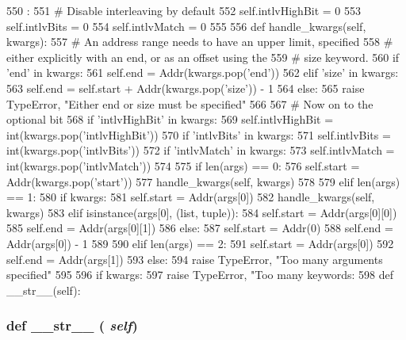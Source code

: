 \begin{DoxyCode}
550                                        :
551         # Disable interleaving by default
552         self.intlvHighBit = 0
553         self.intlvBits = 0
554         self.intlvMatch = 0
555 
556         def handle_kwargs(self, kwargs):
557             # An address range needs to have an upper limit, specified
558             # either explicitly with an end, or as an offset using the
559             # size keyword.
560             if 'end' in kwargs:
561                 self.end = Addr(kwargs.pop('end'))
562             elif 'size' in kwargs:
563                 self.end = self.start + Addr(kwargs.pop('size')) - 1
564             else:
565                 raise TypeError, "Either end or size must be specified"
566 
567             # Now on to the optional bit
568             if 'intlvHighBit' in kwargs:
569                 self.intlvHighBit = int(kwargs.pop('intlvHighBit'))
570             if 'intlvBits' in kwargs:
571                 self.intlvBits = int(kwargs.pop('intlvBits'))
572             if 'intlvMatch' in kwargs:
573                 self.intlvMatch = int(kwargs.pop('intlvMatch'))
574 
575         if len(args) == 0:
576             self.start = Addr(kwargs.pop('start'))
577             handle_kwargs(self, kwargs)
578 
579         elif len(args) == 1:
580             if kwargs:
581                 self.start = Addr(args[0])
582                 handle_kwargs(self, kwargs)
583             elif isinstance(args[0], (list, tuple)):
584                 self.start = Addr(args[0][0])
585                 self.end = Addr(args[0][1])
586             else:
587                 self.start = Addr(0)
588                 self.end = Addr(args[0]) - 1
589 
590         elif len(args) == 2:
591             self.start = Addr(args[0])
592             self.end = Addr(args[1])
593         else:
594             raise TypeError, "Too many arguments specified"
595 
596         if kwargs:
597             raise TypeError, "Too many keywords: %
598 
    def __str__(self):
\end{DoxyCode}
\hypertarget{classm5_1_1params_1_1AddrRange_aa7a4b9bc0941308e362738503137460e}{
\subsubsection[{\_\-\_\-str\_\-\_\-}]{\setlength{\rightskip}{0pt plus 5cm}def \_\-\_\-str\_\-\_\- ( {\em self})}}
\label{classm5_1_1params_1_1AddrRange_aa7a4b9bc0941308e362738503137460e}



